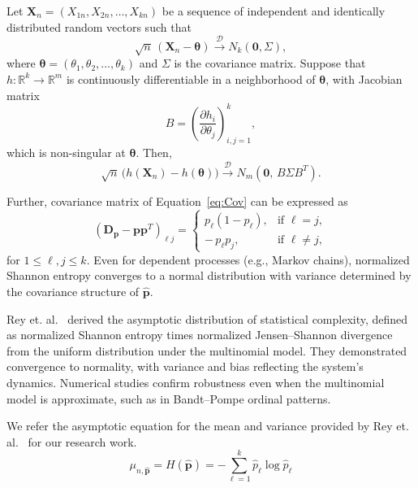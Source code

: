 \documentclass[12pt,a4paper]{article}
\begin{document}
\begin{theorem}
	Let $\mathbf{X}_n= (X_{1n}, X_{2n}, \dots, X_{kn})$ be a sequence of independent and identically distributed random vectors such that 
	\[
	\sqrt{n}\,(\mathbf{X}_n - \boldsymbol{\theta}) \xrightarrow{\mathscr{D}} N_k(\mathbf{0},\Sigma),
	\]
	where $\boldsymbol{\theta} = (\theta_1,\theta_2,\dots,\theta_k)$ and $\Sigma$ is the covariance matrix. 
	Suppose that $h\colon\mathbb{R}^k \to \mathbb{R}^m$ is continuously differentiable in a neighborhood of $\boldsymbol{\theta}$, with Jacobian matrix
	\[
	B = \left( \frac{\partial h_i}{\partial \theta_j} \right)_{i,j=1}^k,
	\]
	which is non-singular at $\boldsymbol{\theta}$. Then,
	\[
	\sqrt{n}\,\big(h(\mathbf{X}_n)-h(\boldsymbol{\theta})\big) \xrightarrow{\mathscr{D}} N_m\!\left(\mathbf{0},\, B \Sigma B^T\right).
	\]
\end{theorem}

Further, covariance matrix of Equation~\eqref{eq:Cov} can be expressed as 
\begin{equation}
	(\mathbf{D_p}-\mathbf{pp}^T)_{\ell j} =
	\begin{cases}
		p_{\ell}(1-p_{\ell}), & \text{if } \ell = j, \\[6pt]
		-\,p_{\ell}p_{j}, & \text{if } \ell \neq j,
	\end{cases}
\end{equation}
for $1\leq {\ell}, j\leq k.$
Even for dependent processes (e.g., Markov chains), normalized Shannon entropy converges to a normal distribution with variance determined by the covariance structure of $\widehat{\mathbf{p}}$. 

Rey et. al.~\cite{Rey2025} derived the asymptotic distribution of statistical complexity, defined as normalized Shannon entropy times normalized Jensen–Shannon divergence from the uniform distribution under the multinomial model. They demonstrated convergence to normality, with variance and bias reflecting the system’s dynamics. Numerical studies confirm robustness even when the multinomial model is approximate, such as in Bandt–Pompe ordinal patterns. 

We refer the asymptotic equation for the mean and variance provided by Rey et. al.~\cite{Rey2025} for our research work.
\begin{equation}
	\mu_{n,\widehat{\mathbf{p}}}	= H(\widehat{\mathbf{p}})
	= -\sum_{\ell=1}^k \widehat{p}_\ell \log \widehat{p}_\ell 
	\label{eq:AsympMean}
\end{equation}  
\end{document}
